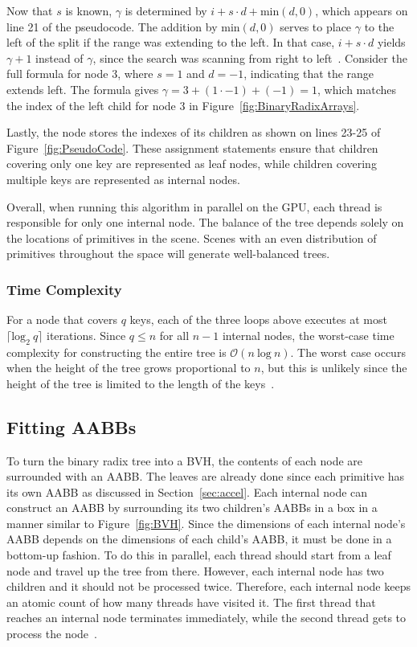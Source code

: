 \documentclass{sig-alternate}
\newcommand{\ceil}[1]{\lceil #1 \rceil}
\begin{document}
Now that $s$ is known, $\gamma$ is determined by $i + s \cdot d + \textrm{min}(d, 0)$, which appears on line 21 of the pseudocode. The addition by $\textrm{min}(d, 0)$ serves to place $\gamma$ to the left of the split if the range was extending to the left. In that case, $i + s \cdot d$ yields $\gamma + 1$ instead of $\gamma$, since the search was scanning from right to left~\cite{Karras:2012}. Consider the full formula for node 3, where $s=1$ and $d=-1$, indicating that the range extends left. The formula gives $\gamma=3+(1 \cdot -1) + (-1)=1$, which matches the index of the left child for node 3 in Figure~\ref{fig:BinaryRadixArrays}.

Lastly, the node stores the indexes of its children as shown on lines 23-25 of Figure~\ref{fig:PseudoCode}. These assignment statements ensure that children covering only one key are represented as leaf nodes, while children covering multiple keys are represented as internal nodes.

Overall, when running this algorithm in parallel on the GPU, each thread is responsible for only one internal node. The balance of the tree depends solely on the locations of primitives in the scene. Scenes with an even distribution of primitives throughout the space will generate well-balanced trees.

\subsubsection{Time Complexity}
\label{sec:time}

For a node that covers $q$ keys, each of the three loops above executes at most $\ceil{\textrm{log}_{2}~q}$ iterations. Since $q \leq n$ for all $n-1$ internal nodes, the worst-case time complexity for constructing the entire tree is $\mathcal{O}(n~\textrm{log}~n)$. The worst case occurs when the height of the tree grows proportional to $n$, but this is unlikely since the height of the tree is limited to the length of the keys~\cite{Karras:2012}.

\subsection{Fitting AABBs}
\label{sec:fitting}

To turn the binary radix tree into a BVH, the contents of each node are surrounded with an AABB. The leaves are already done since each primitive has its own AABB as discussed in Section~\ref{sec:accel}. Each internal node can construct an AABB by surrounding its two children's AABBs in a box in a manner similar to Figure~\ref{fig:BVH}. Since the dimensions of each internal node's AABB depends on the dimensions of each child's AABB, it must be done in a bottom-up fashion. To do this in parallel, each thread should start from a leaf node and travel up the tree from there. However, each internal node has two children and it should not be processed twice. Therefore, each internal node keeps an atomic count of how many threads have visited it. The first thread that reaches an internal node terminates immediately, while the second thread gets to process the node~\cite{Karras:2012}.
\end{document}
